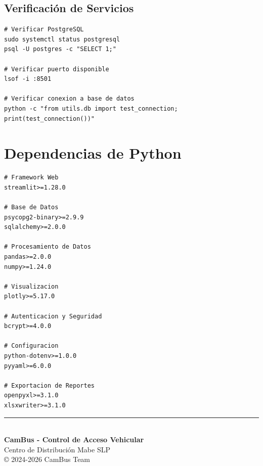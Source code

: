 \documentclass[12pt,a4paper]{article}
\begin{document}
\subsection{Verificación de Servicios}

\begin{lstlisting}[style=bash]
# Verificar PostgreSQL
sudo systemctl status postgresql
psql -U postgres -c "SELECT 1;"

# Verificar puerto disponible
lsof -i :8501

# Verificar conexion a base de datos
python -c "from utils.db import test_connection; print(test_connection())"
\end{lstlisting}

\appendix

\section{Dependencias de Python}

\begin{lstlisting}[basicstyle=\ttfamily\small]
# Framework Web
streamlit>=1.28.0

# Base de Datos
psycopg2-binary>=2.9.9
sqlalchemy>=2.0.0

# Procesamiento de Datos
pandas>=2.0.0
numpy>=1.24.0

# Visualizacion
plotly>=5.17.0

# Autenticacion y Seguridad
bcrypt>=4.0.0

# Configuracion
python-dotenv>=1.0.0
pyyaml>=6.0.0

# Exportacion de Reportes
openpyxl>=3.1.0
xlsxwriter>=3.1.0
\end{lstlisting}


\vfill

\begin{center}
    \rule{0.5\textwidth}{0.5pt}\\[0.5cm]
    {\large\textbf{CamBus - Control de Acceso Vehicular}}\\
    {\small Centro de Distribución Mabe SLP}\\[0.3cm]
    {\small © 2024-2026 CamBus Team}
\end{center}
\end{document}
